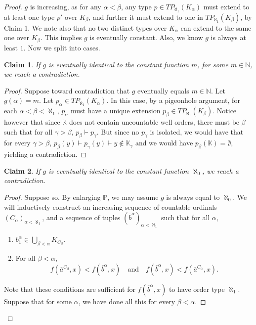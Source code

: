 \documentclass[10pt,a4paper]{amsart}
\newtheorem{claim}{Claim}
\newcommand{\bK}{\mathbb K}
\newcommand{\bN}{\mathbb N}
\newcommand{\bP}{\mathbb P}
\newcommand{\oa}{\overline{a}}
\newcommand{\ob}{\overline{b}}
\begin{document}
\begin{proof}
    $g$ is increasing, as for any $\alpha<\beta$, any type $p \in TP_{\aleph_1}(K_\alpha)$ must extend to at least one type $p'$ over $K_{\beta}$, and further it must extend to one in $TP_{\aleph_1}(K_\beta)$, by Claim 1. We note also that no two distinct types over $K_\alpha$ can extend to the same one over $K_\beta$. This implies $g$ is eventually constant. Also, we know $g$ is always at least $1$. Now we split into cases.
    \begin{claim}
        If $g$ is eventually identical to the constant function $m$, for some $m \in \mathbb{N}$, we reach a contradiction.
    \end{claim}
    \begin{proof}
        Suppose toward contradiction that $g$ eventually equals $m \in \bN$. Let $g(\alpha) = m$. Let $p_\alpha \in TP_{\aleph_1}(K_\alpha)$.
       In this case, by a pigeonhole argument, for each $\alpha<\beta < \aleph_1$, $p_\alpha$ must have a unique extension $p_\beta \in TP_{\aleph_1}(K_\beta)$. Notice however that since $\bK$ does not contain uncountable well orders, there must be $\beta$ such that for all $\gamma>\beta$, $p_\beta \vdash p_\gamma$. But since no $p_\gamma$ is isolated, we would have that for every $\gamma>\beta$,  $p_\beta(y) \vdash p_\gamma(y) \vdash y \notin \bK_\gamma$ and we would have $p_\beta (\bK)=\emptyset$, yielding a contradiction.
    \end{proof}
    \begin{claim}
        If $g$ is eventually identical to the constant function $\aleph_0$, we reach a contradiction.
    \end{claim}
    \begin{proof}
        Suppose so. By enlarging $\bP$, we may assume $g$ is always equal to $\aleph_0$. We will inductively construct an increasing sequence of countable ordinals $(C_\alpha)_{\alpha<\aleph_1}$, and a sequence of tuples $(\ob^{\alpha})_{\alpha<\aleph_1}$ such that for all $\alpha$,
        \begin{enumerate}
        \item $b_1^\alpha \in \bigcup_{\beta<\alpha} K_{C_\beta}$.
        \item For all $\beta<\alpha$,
        \[f(\oa^{C_\beta},x) < f(\ob^{\alpha},x) \quad \text{and} \quad f(\ob^{\alpha},x)<f(\oa^{C_\alpha},x).\]
        \end{enumerate}
        Note that these conditions are sufficient for $f(\ob^{\alpha},x)$ to have order type $\aleph_1$.
        Suppose that for some $\alpha$, we have done all this for every $\beta<\alpha$.

\end{proof}
\end{proof}
\end{document}
